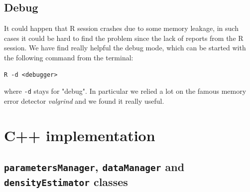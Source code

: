 \subsection{Debug}
It could happen that R session crashes due to some memory leakage, in such cases it could be hard to find the problem since the lack of reports from the R session. We have find really helpful the debug mode, which can be started with the following command from the terminal:

\begin{lstlisting}
R -d <debugger>
\end{lstlisting}

where \verb|-d| stays for "debug". In particular we relied a lot on the famous memory error detector \emph{valgrind} and we found it really useful.

\section{C++ implementation} \label{c++}

\subsection{\texttt{parametersManager}, \texttt{dataManager} and \texttt{densityEstimator} classes}

